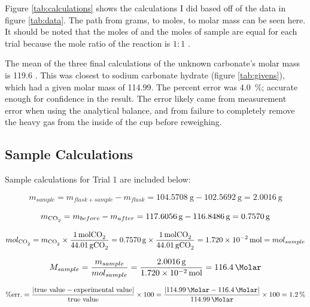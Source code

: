 \documentclass[
journal=aamick,
manuscript=article]{achemso}
\begin{document}
Figure \ref{tab:calculations} shows the calculations I did based off of the data in figure \ref{tab:data}. The path from grams, to moles, to molar mass can be seen here. It should be noted that the moles of  and the moles of sample are equal for each trial because the mole ratio of the reaction is \(1:1\) \cite{i}.

The mean of the three final calculations of the unknown carbonate's molar mass is \SI{119.6}{\Molar} \cite{j}. This was closest to sodium carbonate hydrate (figure \ref{tab:givens}), which had a given molar mass of \SI{114.99}{\Molar}. The percent error was \SI{4.0}{\percent}; accurate enough for confidence in the result. The error likely came from measurement error when using the analytical balance, and from failure to completely remove the heavy  gas from the inside of the cup before reweighing.

\subsection{Sample Calculations}
Sample calculations for Trial 1 are included below:

\begin{equation}
  m_{sample}
  = m_{flask+sample} - m_{flask}
  = \SI{104.5708}{\gram} - \SI{102.5692}{\gram}
  = \SI{2.0016}{\gram}
  \label{eq:msample}
\end{equation}

\begin{equation}
  m_{\ce{CO2}}
  = m_{before} - m_{after}
  = \SI{117.6056}{\gram} - \SI{116.8486}{\gram}
  = \SI{0.7570}{\gram}
  \label{eq:mco2}
\end{equation}

\begin{equation}
  mol_{\ce{CO2}} = m_{\ce{CO2}} \times \frac{\SI{1}{\mole}\ce{CO2}}{\SI{44.01}{\gram}\ce{CO2}}
  = \SI{0.7570}{\gram} \times \frac{\SI{1}{\mole}\ce{CO2}}{\SI{44.01}{\gram}\ce{CO2}}
  = \SI{1.720e-2}{\mole} = mol_{sample}
  \label{eq:molsample}
\end{equation}

\begin{equation}
  M_{sample} = \frac{m_{sample}}{mol_{sample}}
  = \frac{\SI{2.0016}{\gram}}{\SI{1.720e-2}{\mole}}
  = \SI{116.4}{\Molar}
  \label{eq:molaritysample}
\end{equation}

\begin{equation}
  \text{\%err.}
  = \frac{|\text{true value}-\text{experimental value}|}{\text{true value}} \times 100
  = \frac{|\SI{114.99}{\Molar}-\SI{116.4}{\Molar}|}{\SI{114.99}{\Molar}} \times 100
  = \SI{1.2}{\percent}
  \label{eq:error1}
\end{equation}
\end{document}
